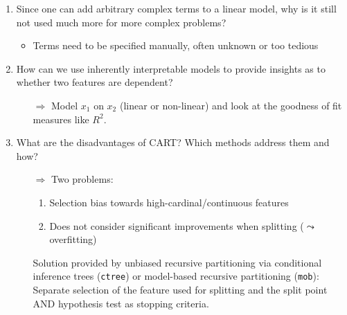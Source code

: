 \begin{enumerate}
\begin{itemize}
        \end{itemize}
        \item Since one can add arbitrary complex terms to a linear model, why is it still not used much more for more complex problems?
        \begin{itemize}
            \item Terms need to be specified manually, often unknown or too tedious
        \end{itemize}
    	\item How can we use inherently interpretable models to provide insights as to whether two features are dependent?
    	\begin{itemize}
    		\item[$\Rightarrow$] Model $x_1$ on $x_2$ (linear or non-linear) and look at the goodness of fit measures like $R^2$.
    	\end{itemize}
    	\item What are the disadvantages of CART? Which methods address them and how?
    	\begin{itemize}
    		\item[$\Rightarrow$] Two problems:
    		\begin{enumerate}[1.]
    			\item Selection bias towards high-cardinal/continuous features 
    			\item Does not consider significant improvements when splitting ($\leadsto$ overfitting)
    		\end{enumerate}
    		Solution provided by unbiased recursive partitioning via conditional inference trees (\texttt{ctree}) or model-based recursive partitioning (\texttt{mob}): Separate selection of the feature used for splitting and the split point AND hypothesis test as stopping criteria.
    	\end{itemize}
	\end{enumerate}